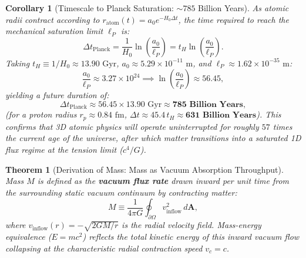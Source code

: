 \documentclass[11pt,a4paper]{article}
\newtheorem{theorem}{Theorem}[section]
\newtheorem{corollary}{Corollary}[theorem]
\begin{document}
\begin{corollary}[Timescale to Planck Saturation: $\sim 785$ Billion Years]
    \label{cor:planck_boyuna_inme_zamani_sc}
    As atomic radii contract according to $r_{\mathrm{atom}}(t) = a_0 e^{-H_0 \Delta t}$, the time required to reach the mechanical saturation limit $\ell_P$ is:
    \begin{equation}
        \Delta t_{\mathrm{Planck}} = \frac{1}{H_0} \ln\left( \frac{a_0}{\ell_P} \right) = t_H \ln\left( \frac{a_0}{\ell_P} \right).
        \label{eq:planck_zamani_hesap_sc}
    \end{equation}
    Taking $t_H \equiv 1/H_0 \approx 13.90\text{ Gyr}$, $a_0 \approx 5.29 \times 10^{-11}\text{ m}$, and $\ell_P \approx 1.62 \times 10^{-35}\text{ m}$:
    \begin{equation}
        \frac{a_0}{\ell_P} \approx 3.27 \times 10^{24} \implies \ln\left( \frac{a_0}{\ell_P} \right) \approx 56.45,
    \end{equation}
    yielding a future duration of:
    \begin{equation}
        \Delta t_{\mathrm{Planck}} \approx 56.45 \times 13.90\text{ Gyr} \approx \mathbf{785\text{ Billion Years}},
        \label{eq:785_milyar_yil_sc}
    \end{equation}
    (for a proton radius $r_p \approx 0.84\text{ fm}$, $\Delta t \approx 45.4 \, t_H \approx \mathbf{631\text{ Billion Years}}$). This confirms that 3D atomic physics will operate uninterrupted for roughly $57$ times the current age of the universe, after which matter transitions into a saturated 1D flux regime at the tension limit ($c^4/G$).
\end{corollary}

\begin{theorem}[Derivation of Mass: Mass as Vacuum Absorption Throughput]
    \label{thm:kutle_turetilis}
    Mass $M$ is defined as the \textbf{vacuum flux rate} drawn inward per unit time from the surrounding static vacuum continuum by contracting matter:
    \begin{equation}
        M \equiv \frac{1}{4\pi G} \oint_{\partial \Omega} v_{\mathrm{inflow}}^2 \, d\mathbf{A},
        \label{eq:kutle_tanim}
    \end{equation}
    where $v_{\mathrm{inflow}}(r) = -\sqrt{2GM/r}$ is the radial velocity field. Mass-energy equivalence ($E = mc^2$) reflects the total kinetic energy of this inward vacuum flow collapsing at the characteristic radial contraction speed $v_c = c$.
\end{theorem}
\end{document}
